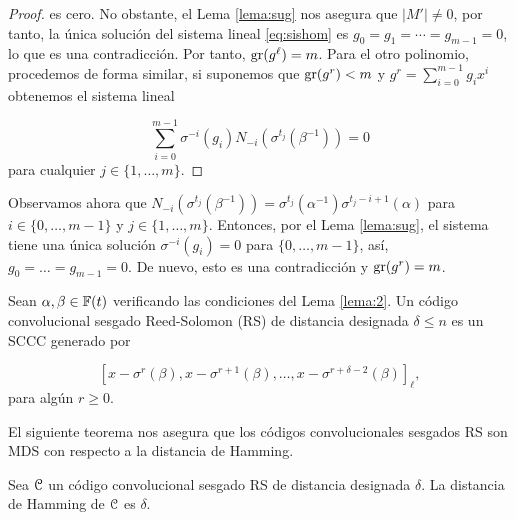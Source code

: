 \begin{proof}
es cero. No obstante, el Lema \ref{lema:sug} nos asegura que $|M'| \neq 0$, por tanto, la única solución del sistema lineal \eqref{eq:sishom} es $g_0 = g_1 = \cdots = g_{m-1} = 0$, lo que es una contradicción. Por tanto, $\operatorname{gr}(g^\ell) = m$. Para el otro polinomio, procedemos de forma similar, si suponemos que $\operatorname{gr}(g^r) < m$ y $g^r = \sum_{i=0}^{m-1}g_ix^i$ obtenemos el sistema lineal 

\begin{equation}
\sum_{i=0}^{m-1}\sigma^{-i}(g_i)N_{-i}(\sigma^{t_j}(\beta^{-1})) = 0
\end{equation}
para cualquier $j \in \{1,\dots,m\}.$
\end{proof}

Observamos ahora que $N_{-i}(\sigma^{t_j}(\beta^{-1})) = \sigma^{t_j}(\alpha^{-1})\sigma^{t_j-i+1}(\alpha)$ para $i \in \{0,\dots,m-1\}$ y $j \in \{1,\dots,m\}$. Entonces, por el Lema \ref{lema:sug}, el sistema tiene una única solución $\sigma^{-i}(g_i) = 0$ para $\{0,\dots,m-1\}$, así, $g_0 = \dots = g_{m-1} = 0$. De nuevo, esto es una contradicción y $\operatorname{gr}(g^r) = m$.

\begin{definicion}\label{def:RS}
Sean $\alpha,\beta \in \mathbb{F}(t)$ verificando las condiciones del Lema \ref{lema:2}. Un código convolucional sesgado Reed-Solomon (RS) de distancia designada $\delta \leq n$ es un SCCC generado por 

$$[x - \sigma^r(\beta),x-\sigma^{r+1}(\beta),\dots,x - \sigma^{r + \delta - 2}(\beta)]_\ell,$$
para algún $r \geq 0.$
\end{definicion}

El siguiente teorema nos asegura que los códigos convolucionales sesgados RS son MDS con respecto a la distancia de Hamming.

\begin{teorema}\label{th:dist}
Sea $\mathcal C$ un código convolucional sesgado RS de distancia designada $\delta$. La distancia de Hamming de $\mathcal C$ es $\delta$.
\end{teorema}

